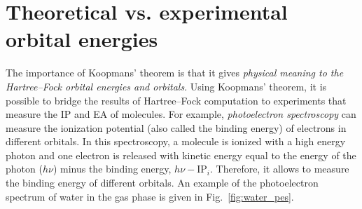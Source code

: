 \documentclass[../Main/chem371-notes.tex]{subfiles}
\begin{document}
\section{Theoretical vs. experimental orbital energies}

The importance of Koopmans' theorem is that it gives \emph{physical meaning to the Hartree--Fock orbital energies and orbitals}.
Using Koopmans' theorem, it is possible to bridge the results of Hartree--Fock computation to experiments that measure the IP and EA of molecules.
For example, \emph{photoelectron spectroscopy} can measure the ionization potential (also called the binding energy) of electrons in different orbitals.
In this spectroscopy, a molecule is ionized with a high energy photon and one electron is released with kinetic energy equal to the energy of the photon ($h \nu$) minus the binding energy, $h \nu - \mathrm{IP}_i$.
Therefore, it allows to measure the binding energy of different orbitals.
An example of the photoelectron spectrum of water in the gas phase is given in Fig.~\ref{fig:water_pes}.
\end{document}
